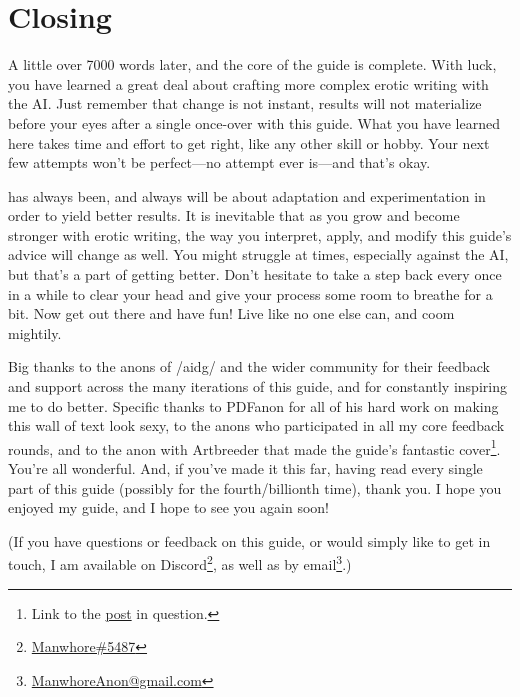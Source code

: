 ﻿\documentclass[Coomer-main.tex]{subfiles}
\begin{document}
\begin{enumerate}
\end{enumerate}

\chapter{Closing}

 A little over 7000 words later, and the core of the guide is complete.
With luck, you have learned a great deal about crafting more complex erotic writing with the AI.
Just remember that change is not instant, results will not materialize before your eyes after a single once-over with this guide.
What you have learned here takes time and effort to get right, like any other skill or hobby.
Your next few attempts won't be perfect—no attempt ever is—and that's okay.

\aid has always been, and always will be about adaptation and experimentation in order to yield better results.
It is inevitable that as you grow and become stronger with erotic writing, the way you interpret, apply, and modify this guide's advice will change as well.
You might struggle at times, especially against the AI, but that's a part of getting better.
Don't hesitate to take a step back every once in a while to clear your head and give your process some room to breathe for a bit.
Now get out there and have fun!
Live like no one else can, and coom mightily.

Big thanks to the anons of /aidg/ and the wider \aid community for their feedback and support across the many iterations of this guide, and for constantly inspiring me to do better.
Specific thanks to PDFanon for all of his hard work on making this wall of text look sexy, to the anons who participated in all my core feedback rounds, and to the anon with Artbreeder that made the guide’s fantastic cover\footnote{Link to the \href{https://arch.b4k.co/vg/thread/313360917/\#q313434592}{post} in question.}.
You're all wonderful.
And, if you've made it this far, having read every single part of this guide (possibly for the fourth/billionth time), thank you.
I hope you enjoyed my guide, and I hope to see you again soon!
\bigskip

(If you have questions or feedback on this guide, or would simply like to get in touch, I am available on Discord\footnote{\href{https://discordapp.com/users/773014944718389248}{Manwhore\#5487}}, as well as by email\footnote{\href{mailto:ManwhoreAnon@gmail.com}{ManwhoreAnon@gmail.com}}.)
\end{document}
